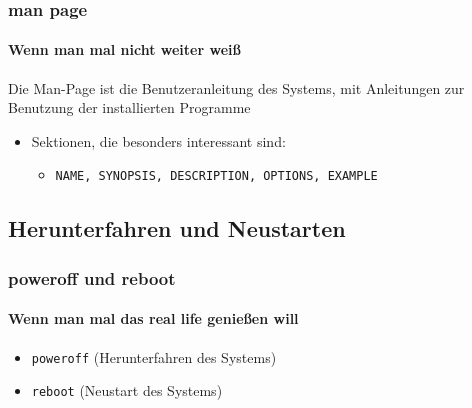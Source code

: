 \documentclass[12pt,utf8]{beamer}
\begin{document}
\begin{frame}
	\frametitle{man page}
	\framesubtitle{\textcolor{ownDarkOr}{Wenn man mal nicht weiter weiß}}
	Die Man-Page ist die Benutzeranleitung des Systems, mit Anleitungen zur Benutzung der installierten Programme
	\begin{itemize}
		\item Sektionen, die besonders interessant sind:
		\begin{itemize}
			\item {\scriptsize \texttt{NAME, SYNOPSIS, DESCRIPTION, OPTIONS, EXAMPLE}}
		\end{itemize}
	\end{itemize}
\end{frame}


\subsection{Herunterfahren und Neustarten}
\begin{frame}
\frametitle{poweroff und reboot}
\framesubtitle{\textcolor{ownDarkOr}{Wenn man mal das real life genießen will}}
\begin{itemize}
	\item \texttt{poweroff} (Herunterfahren des Systems)
	\item \texttt{reboot} (Neustart des Systems)
\end{itemize}
\end{frame}
\end{document}
